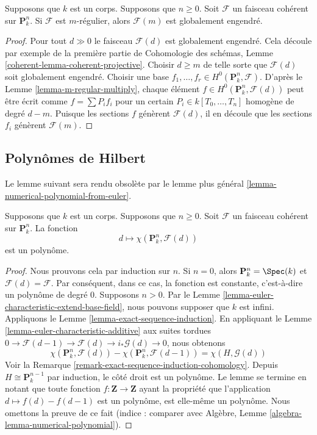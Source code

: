 \begin{lemma}
\label{lemma-m-regular-globally-generated}
Supposons que $k$ est un corps. Supposons que $n
\geq 0$. Soit $\mathcal{F}$ un faisceau cohérent
sur $\mathbf{P}^n_k$. Si $\mathcal{F}$ est
$m$-régulier, alors $\mathcal{F}(m)$ est globalement engendré.
\end{lemma}

\begin{proof}
Pour tout $d \gg 0$ le faisceau $\mathcal{F}(d)$ est globalement
engendré. Cela découle par exemple de la première partie de
Cohomologie des schémas, Lemme
\ref{coherent-lemma-coherent-projective}. Choisir $d \geq m$ de telle sorte
que $\mathcal{F}(d)$ soit globalement engendré. Choisir une base $f_1,
\ldots, f_r \in H^0(\mathbf{P}^n_k, \mathcal{F})$. D'après le Lemme
\ref{lemma-m-regular-multiply}, chaque élément $f \in H^0(\mathbf{P}^n_k,
\mathcal{F}(d))$ peut être écrit comme $f = \sum P_if_i$ pour un certain $P_i \in
k[T_0, \ldots, T_n]$ homogène de degré $d - m$. Puisque les sections $f$ génèrent
$\mathcal{F}(d)$, il en découle que les sections $f_i$ génèrent $\mathcal{F}(m)$.
\end{proof}

\subsection{Polynômes de Hilbert}
\label{subsection-hilbert}

\noindent
Le lemme suivant sera rendu obsolète par le lemme plus
général \ref{lemma-numerical-polynomial-from-euler}.

\begin{lemma}
\label{lemma-hilbert-polynomial}
Supposons que $k$ est un corps. Supposons que $n \geq 0$. Soit
$\mathcal{F}$ un faisceau cohérent sur $\mathbf{P}^n_k$. La fonction
$$
d \longmapsto \chi(\mathbf{P}^n_k, \mathcal{F}(d))
$$
est un polynôme.
\end{lemma}

\begin{proof}
Nous prouvons cela par induction sur $n$. Si $n =
0$, alors $\mathbf{P}^n_k = \Spec(k)$ et
$\mathcal{F}(d) = \mathcal{F}$. Par conséquent, dans
ce cas, la fonction est constante, c’est-à-dire un
polynôme de degré $0$. Supposons $n > 0$. Par le Lemme
\ref{lemma-euler-characteristic-extend-base-field},
nous pouvons supposer que $k$ est infini. Appliquons
le Lemme \ref{lemma-exact-sequence-induction}. En
appliquant le Lemme
\ref{lemma-euler-characteristic-additive} aux suites tordues $0 \to
\mathcal{F}(d - 1) \to \mathcal{F}(d) \to i_*\mathcal{G}(d) \to 0$, nous obtenons
$$
\chi(\mathbf{P}^n_k, \mathcal{F}(d)) -
\chi(\mathbf{P}^n_k, \mathcal{F}(d - 1)) =
\chi(H, \mathcal{G}(d))
$$
Voir la Remarque
\ref{remark-exact-sequence-induction-cohomology}. Depuis $H
\cong \mathbf{P}^{n - 1}_k$ par induction, le côté droit est un
polynôme. Le lemme se termine en notant que toute fonction $f :
\mathbf{Z} \to \mathbf{Z}$ ayant la propriété que l'application
$d \mapsto f(d) - f(d - 1)$ est un polynôme, est elle-même un
polynôme. Nous omettons la preuve de ce fait (indice : comparer
avec Algèbre, Lemme \ref{algebra-lemma-numerical-polynomial}).
\end{proof}

